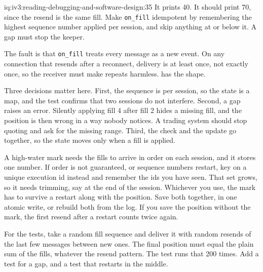 \begin{solution}{iq:iv3:reading-debugging-and-software-design:35}
It prints 40. It should print 70, since the resend is the same fill. Make \texttt{on\_fill} idempotent by remembering the highest sequence number applied per session, and skip anything at or below it. A gap must stop the keeper.

The fault is that \texttt{on\_fill} treats every message as a new event. On any connection that resends after a reconnect, delivery is at least once, not exactly once, so the receiver must make repeats harmless.  has the shape.

\enlargethispage{-3\baselineskip}%
\label{lst:iv3:rd:replayfixed}

Three decisions matter here. First, the sequence is per session, so the state is a map, and the test confirms that two sessions do not interfere. Second, a gap raises an error. Silently applying fill 4 after fill 2 hides a missing fill, and the position is then wrong in a way nobody notices. A trading system should stop quoting and ask for the missing range. Third, the check and the update go together, so the state moves only when a fill is applied.

A high-water mark needs the fills to arrive in order on each session, and it stores one number. If order is not guaranteed, or sequence numbers restart, key on a unique execution id instead and remember the ids you have seen. That set grows, so it needs trimming, say at the end of the session. Whichever you use, the mark has to survive a restart along with the position. Save both together, in one atomic write, or rebuild both from the log. If you save the position without the mark, the first resend after a restart counts twice again.

For the tests, take a random fill sequence and deliver it with random resends of the last few messages between new ones. The final position must equal the plain sum of the fills, whatever the resend pattern. The test runs that 200 times. Add a test for a gap, and a test that restarts in the middle.


\end{solution}

